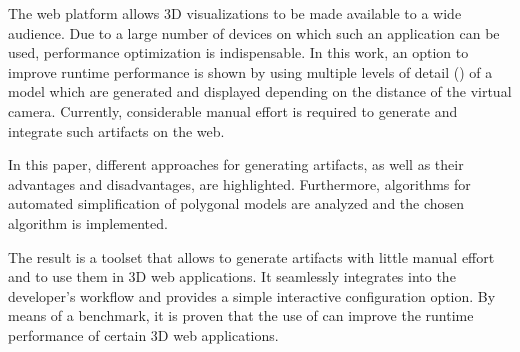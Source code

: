 
The web platform allows 3D visualizations to be made available to a wide audience. Due to a large number of devices on which such an application can be used, performance optimization is indispensable. In this work, an option to improve runtime performance is shown by using multiple levels of detail () of a model which are generated and displayed depending on the distance of the virtual camera. Currently, considerable manual effort is required to generate and integrate such artifacts on the web.

In this paper, different approaches for generating  artifacts, as well as their advantages and disadvantages, are highlighted.
Furthermore, algorithms for automated simplification of polygonal models are analyzed and the chosen algorithm is implemented.

The result is a toolset that allows to generate  artifacts with little manual effort and to use them in 3D web applications.
It seamlessly integrates into the developer's workflow and provides a simple interactive configuration option.
By means of a benchmark, it is proven that the use of  can improve the runtime performance of certain 3D web applications.
